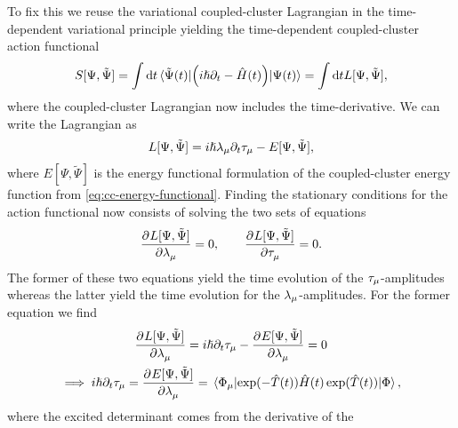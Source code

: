         To fix this we reuse the variational coupled-cluster Lagrangian in the
        time-dependent variational principle yielding the time-dependent
        coupled-cluster action functional \cite{kvaal2013variational}
        \begin{align}
            S[\Psi, \tilde{\Psi}]
            = \int\dd t
            \mel*{\tilde{\Psi}(t)}{
                \left( 
                    i\hslash\partial_t
                    - \hat{H}(t)
                 \right)
            }{\Psi(t)}
            = \int\dd t
            L[\Psi, \tilde{\Psi}],
            \label{eq:cc-action-functional}
        \end{align}
        where the coupled-cluster Lagrangian now includes the time-derivative.
        We can write the Lagrangian as
        \begin{align}
            L[\Psi, \tilde{\Psi}]
            = i\hslash \lambda_{\mu}\partial_t\tau_{\mu}
            - E[\Psi, \tilde{\Psi}],
        \end{align}
        where $E[\Psi, \tilde{\Psi}]$ is the energy functional formulation of
        the coupled-cluster energy function from
        \autoref{eq:cc-energy-functional}.
        Finding the stationary conditions for the action functional now consists
        of solving the two sets of equations
        \begin{align}
            \dpd{L[\Psi, \tilde{\Psi}]}{\clustlamp_{\mu}} = 0,
            \qquad
            \dpd{L[\Psi, \tilde{\Psi}]}{\clustamp_{\mu}} = 0.
        \end{align}
        The former of these two equations yield the time evolution of the
        $\tau_{\mu}$-amplitudes whereas the latter yield the
        time evolution for the $\lambda_{\mu}$-amplitudes.
        For the former equation we find
        \begin{gather}
            \dpd{L[\Psi, \tilde{\Psi}]}{\clustlamp_{\mu}}
            =
            i\hslash\partial_t\clustamp_{\mu}
            - \dpd{E[\Psi, \tilde{\Psi}]}{\clustlamp_{\mu}}
            = 0
            \\
            \implies
            i\hslash\partial_t\clustamp_{\mu}
            =
            \dpd{E[\Psi, \tilde{\Psi}]}{\clustlamp_{\mu}}
            =
            \mel*{\slat_{\mu}}{
                \exponential(-\clust(t))
                \hamil(t)
                \exponential(\clust(t))
            }{\slat},
            \label{eq:time-evolution-tau}
        \end{gather}
        where the excited determinant comes from the derivative of the
